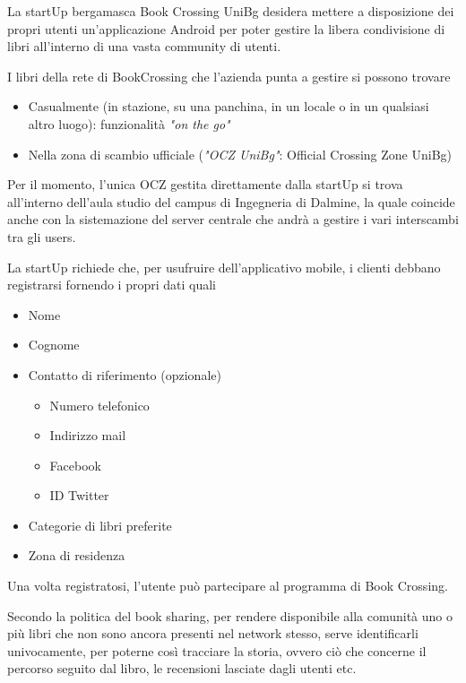La startUp bergamasca Book Crossing UniBg desidera mettere a disposizione dei propri
utenti un'applicazione Android per poter gestire la libera condivisione di libri all'interno di una vasta community di utenti.

I libri della rete di BookCrossing che l'azienda punta a gestire si possono trovare
\begin{itemize}
	\item Casualmente (in stazione, su una panchina, in un locale o in un qualsiasi altro luogo): funzionalità \textit{"on the go"}
	\item Nella zona di scambio ufficiale (\textit{"OCZ UniBg"}: Official Crossing Zone UniBg)
\end{itemize}

Per il momento, l'unica OCZ gestita direttamente dalla startUp si trova all'interno dell'aula studio del campus di Ingegneria di Dalmine, la quale coincide anche con la sistemazione del server centrale che andrà a gestire i vari interscambi tra gli users.

La startUp richiede che, per usufruire dell'applicativo mobile, i clienti debbano registrarsi fornendo i propri dati quali
\begin{itemize}
	\item Nome
	\item Cognome
	\item Contatto di riferimento (opzionale)
	\begin{itemize}
		\item Numero telefonico
		\item Indirizzo mail
		\item Facebook
		\item ID Twitter
	\end{itemize}
	\item Categorie di libri preferite
	\item Zona di residenza
\end{itemize}

Una volta registratosi, l'utente può partecipare al programma di Book Crossing.

Secondo la politica del book sharing, per rendere disponibile alla comunità 
uno o più libri che non sono ancora presenti nel network stesso, 
serve
identificarli univocamente, per poterne così tracciare la storia, ovvero ciò 
che concerne il percorso seguito dal libro, le recensioni lasciate dagli utenti etc.

